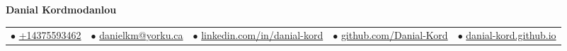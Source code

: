 \documentclass{article}
\begin{document}
    \fontsize{9}{13.5}
    \selectfont
    \begin{center}
        \begin{center}
            \Huge\bfseries Danial Kordmodanlou
        \end{center}
            \begin{tabular}{c c c c c}
               $\bullet$ \href{tel:Phone-Number}{+14375593462}  & 
              $\bullet$  \href{mailto:mailid@mail.com}{danielkm@yorku.ca}  & 
              $\bullet$  \href{https://www.linkedin.com/in/danial-kord/}{linkedin.com/in/danial-kord} & 
              $\bullet$  \href{https://github.com/Danial-Kord}{github.com/Danial-Kord} &  
              $\bullet$ \href{https://danial-kord.github.io/}{danial-kord.github.io} \\
        \end{tabular}
    \end{center}    
    \vspace{-0.75em}
    
    
    
    
    
    
  
\end{document}
